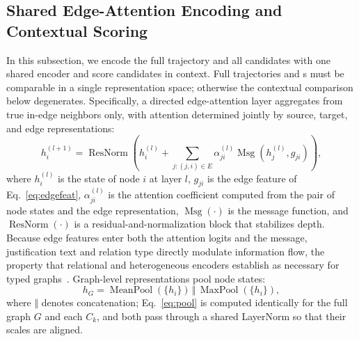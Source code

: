 \subsection{Shared Edge-Attention Encoding and Contextual Scoring}

In this subsection, we encode the full trajectory and all candidates with one shared encoder and score candidates in context. Full trajectories and \csg{}s must be comparable in a single representation space; otherwise the contextual comparison below degenerates. Specifically, a directed edge-attention layer aggregates from true in-edge neighbors only, with attention determined jointly by source, target, and edge representations:
\begin{equation}
h_i^{(l+1)}=\operatorname{ResNorm}\!\left(
h_i^{(l)}+
\sum_{j:(j,i)\in E}
\alpha_{ji}^{(l)}\operatorname{Msg}(h_j^{(l)},g_{ji})
\right),
\label{eq:edgegat}
\end{equation}
where $h_i^{(l)}$ is the state of node $i$ at layer $l$, $g_{ji}$ is the edge feature of Eq.~\eqref{eq:edgefeat}, $\alpha_{ji}^{(l)}$ is the attention coefficient computed from the pair of node states and the edge representation, $\operatorname{Msg}(\cdot)$ is the message function, and $\operatorname{ResNorm}(\cdot)$ is a residual-and-normalization block that stabilizes depth. Because edge features enter both the attention logits and the message, justification text and relation type directly modulate information flow, the property that relational and heterogeneous encoders establish as necessary for typed graphs~\cite{schlichtkrull2017modeling,hu2020heterogeneous}. Graph-level representations pool node states:
\begin{equation}
h_G=\operatorname{MeanPool}(\{h_i\})\,\Vert\,\operatorname{MaxPool}(\{h_i\}),
\label{eq:pool}
\end{equation}
where $\Vert$ denotes concatenation; Eq.~\eqref{eq:pool} is computed identically for the full graph $G$ and each \csg{} $C_k$, and both pass through a shared LayerNorm so that their scales are aligned.

